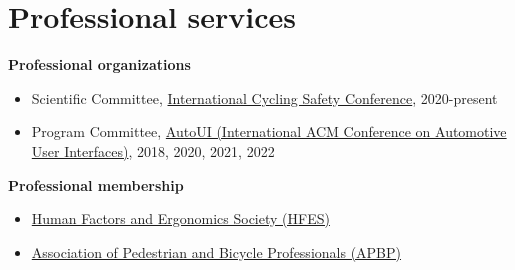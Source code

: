 \documentclass[11pt]{article}
\newenvironment{main}
{\begin{adjustwidth}{3em}{}}
{\end{adjustwidth}}
\begin{document}
\section*{Professional services}
\begin{main}

\textbf{Professional organizations}
\begin{itemize}
    \item Scientific Committee, \href{http://www.cyclingsafety.net}{International Cycling Safety Conference}, 2020-present
    \item Program Committee, \href{https://www.auto-ui.org/}{AutoUI (International ACM Conference on Automotive User Interfaces)}, 2018, 2020, 2021, 2022
\end{itemize}

\textbf{Professional membership}
\begin{itemize}
    \item \href{https://www.hfes.org/}{Human Factors and Ergonomics Society (HFES)}
    \item \href{https://www.apbp.org/}{Association of Pedestrian and Bicycle Professionals (APBP)}
\end{itemize}


\end{main}
\end{document}
